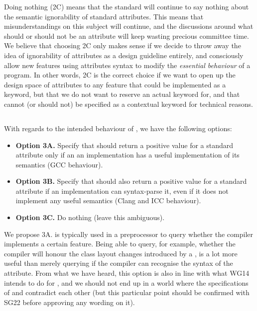 Doing nothing (2C) means that the standard will continue to say nothing about the semantic ignorability of standard attributes. This means that misunderstandings on this subject will continue, and the discussions around what should or should not be an attribute will keep wasting precious committee time. We believe that choosing 2C only makes sense if we decide to throw away the idea of ignorability of attributes as a design guideline entirely, and consciously allow new features using attributes syntax to modify the \emph{essential behaviour} of a program. In other words, 2C is the correct choice if we want to open up the design space of attributes to any feature that could be implemented as a keyword, but that we do not want to reserve an actual keyword for, and that cannot (or should not) be specified as a contextual keyword for technical reasons.

\subsection{}

With regards to the intended behaviour of , we have the following options:

\begin{itemize}
\item \textbf{Option 3A.} Specify that  should return a positive value for a standard attribute only if an an implementation has a useful implementation of its semantics (GCC behaviour).
\item \textbf{Option 3B.} Specify that  should also return a positive value for a standard attribute if an implementation can syntax-parse it, even if it does not implement any useful semantics (Clang and ICC behaviour).
\item \textbf{Option 3C.} Do nothing (leave this ambiguous).
\end{itemize}

We propose 3A.  is typically used in a preprocessor  to query whether the compiler implements a certain feature. Being able to query, for example, whether the compiler will honour the class layout changes introduced by a , is a lot more useful than merely querying if the compiler can recognise the syntax of the attribute. From what we have heard, this option is also in line with what WG14 intends to do for , and we should not end up in a world where the specifications of  and  contradict each other (but this particular point should  be confirmed with SG22 before approving any wording on it).

